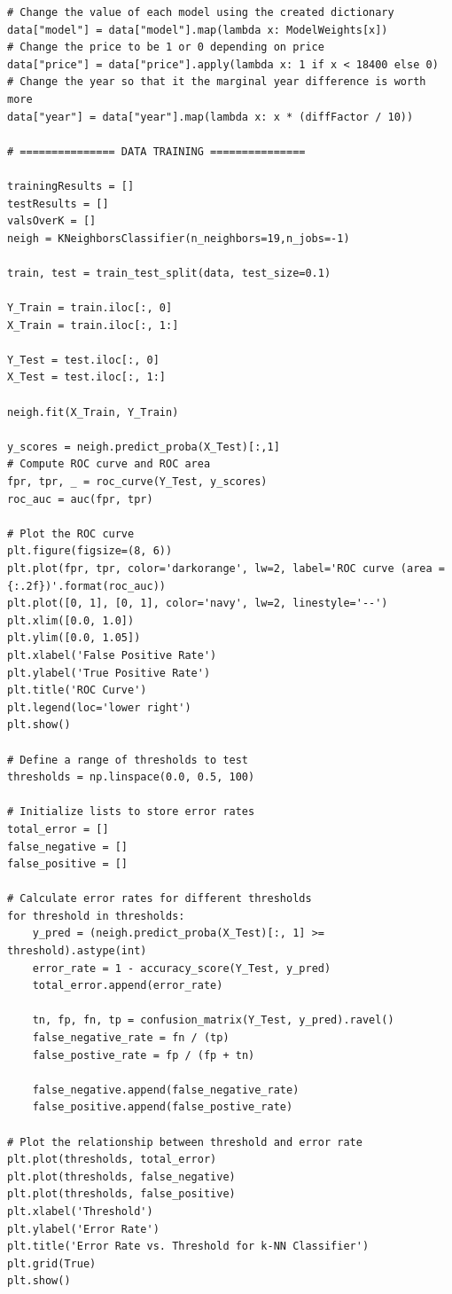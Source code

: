 \documentclass{article}
\begin{document}
\begin{lstlisting}
# Change the value of each model using the created dictionary
data["model"] = data["model"].map(lambda x: ModelWeights[x])
# Change the price to be 1 or 0 depending on price
data["price"] = data["price"].apply(lambda x: 1 if x < 18400 else 0)
# Change the year so that it the marginal year difference is worth more
data["year"] = data["year"].map(lambda x: x * (diffFactor / 10))

# =============== DATA TRAINING ===============

trainingResults = []
testResults = []
valsOverK = []
neigh = KNeighborsClassifier(n_neighbors=19,n_jobs=-1)

train, test = train_test_split(data, test_size=0.1)

Y_Train = train.iloc[:, 0]
X_Train = train.iloc[:, 1:]

Y_Test = test.iloc[:, 0]
X_Test = test.iloc[:, 1:]

neigh.fit(X_Train, Y_Train)

y_scores = neigh.predict_proba(X_Test)[:,1]
# Compute ROC curve and ROC area
fpr, tpr, _ = roc_curve(Y_Test, y_scores)
roc_auc = auc(fpr, tpr)

# Plot the ROC curve
plt.figure(figsize=(8, 6))
plt.plot(fpr, tpr, color='darkorange', lw=2, label='ROC curve (area = {:.2f})'.format(roc_auc))
plt.plot([0, 1], [0, 1], color='navy', lw=2, linestyle='--')
plt.xlim([0.0, 1.0])
plt.ylim([0.0, 1.05])
plt.xlabel('False Positive Rate')
plt.ylabel('True Positive Rate')
plt.title('ROC Curve')
plt.legend(loc='lower right')
plt.show()

# Define a range of thresholds to test
thresholds = np.linspace(0.0, 0.5, 100)

# Initialize lists to store error rates
total_error = []
false_negative = []
false_positive = []

# Calculate error rates for different thresholds
for threshold in thresholds:
    y_pred = (neigh.predict_proba(X_Test)[:, 1] >= threshold).astype(int)
    error_rate = 1 - accuracy_score(Y_Test, y_pred)
    total_error.append(error_rate)

    tn, fp, fn, tp = confusion_matrix(Y_Test, y_pred).ravel()
    false_negative_rate = fn / (tp)
    false_postive_rate = fp / (fp + tn)

    false_negative.append(false_negative_rate)
    false_positive.append(false_postive_rate)

# Plot the relationship between threshold and error rate
plt.plot(thresholds, total_error)
plt.plot(thresholds, false_negative)
plt.plot(thresholds, false_positive)
plt.xlabel('Threshold')
plt.ylabel('Error Rate')
plt.title('Error Rate vs. Threshold for k-NN Classifier')
plt.grid(True)
plt.show()
\end{lstlisting}
\end{document}
